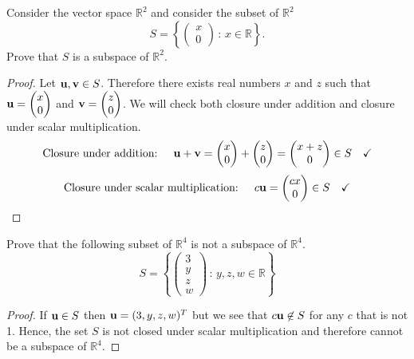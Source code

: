    \begin{example}
       Consider the vector space $\mathbb{R}^2$ and consider the subset of $\mathbb{R}^2$ 
       \[ S = \left\{ \begin{pmatrix} x \\ 0 \end{pmatrix} \, : \, x \in \mathbb{R}
       \right\}. \]
       Prove that $S$ is a subspace of $\mathbb{R}^2$.
   \begin{proof}
       Let ${\bf u},{\bf v} \in S$.  Therefore there exists real numbers $x$ and $z$ such that ${\bf u} =
       \begin{pmatrix} x \\ 0 \end{pmatrix}$ and ${\bf v} = \begin{pmatrix} z \\ 0
       \end{pmatrix}$.  We will check both closure under addition and closure under scalar
       multiplication.
       \[ \text{Closure under addition: } \quad {\bf u} + {\bf v} = \begin{pmatrix} x \\ 0
           \end{pmatrix} + \begin{pmatrix} z \\ 0 \end{pmatrix} = \begin{pmatrix} x+z \\ 0
       \end{pmatrix} \in S \quad \checkmark \]
       \[ \text{Closure under scalar multiplication: } \quad c {\bf u} = \begin{pmatrix} cx \\
           0 \end{pmatrix} \in S \quad \checkmark \]
   \end{proof}
   \end{example}

   \begin{example}
       Prove that the following subset of $\mathbb{R}^4$ is not a subspace of
       $\mathbb{R}^4$.
       \[ S = \left\{ \begin{pmatrix} 3 \\ y \\ z \\ w \end{pmatrix} \, : \,
       y,z,w\in\mathbb{R} \right\} \]
   \begin{proof}
       If ${\bf u} \in S$ then ${\bf u} = (3,y,z,w)^T$ but we see that $c{\bf u} \not \in S$ for any
       $c$ that is not 1.  Hence, the set $S$ is not closed under scalar multiplication
       and therefore cannot be a subspace of $\mathbb{R}^4$.
   \end{proof}
   \end{example}

